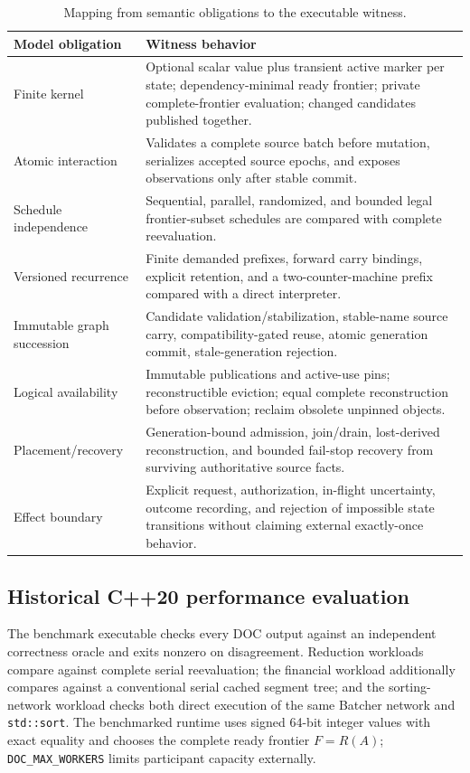 \begin{table}[t]
\centering\scriptsize
\caption{Mapping from semantic obligations to the executable witness.}\label{tab:witness}
\begin{tabularx}{\textwidth}{@{}p{}X@{}}
\toprule Model obligation & Witness behavior\\ \midrule
Finite kernel & Optional scalar value plus transient active marker per state; dependency-minimal ready frontier; private complete-frontier evaluation; changed candidates published together.\\
Atomic interaction & Validates a complete source batch before mutation, serializes accepted source epochs, and exposes observations only after stable commit.\\
Schedule independence & Sequential, parallel, randomized, and bounded legal frontier-subset schedules are compared with complete reevaluation.\\
Versioned recurrence & Finite demanded prefixes, forward carry bindings, explicit retention, and a two-counter-machine prefix compared with a direct interpreter.\\
Immutable graph succession & Candidate validation/stabilization, stable-name source carry, compatibility-gated reuse, atomic generation commit, stale-generation rejection.\\
Logical availability & Immutable publications and active-use pins; reconstructible eviction; equal complete reconstruction before observation; reclaim obsolete unpinned objects.\\
Placement/recovery & Generation-bound admission, join/drain, lost-derived reconstruction, and bounded fail-stop recovery from surviving authoritative source facts.\\
Effect boundary & Explicit request, authorization, in-flight uncertainty, outcome recording, and rejection of impossible state transitions without claiming external exactly-once behavior.\\ \bottomrule
\end{tabularx}
\end{table}

\subsection{Historical C++20 performance evaluation}
The benchmark executable checks every DOC output against an independent correctness oracle and exits nonzero on disagreement. Reduction workloads compare against complete serial reevaluation; the financial workload additionally compares against a conventional serial cached segment tree; and the sorting-network workload checks both direct execution of the same Batcher network and \texttt{std::sort}. The benchmarked runtime uses signed 64-bit integer values with exact equality and chooses the complete ready frontier $F=R(A)$; \texttt{DOC\_MAX\_WORKERS} limits participant capacity externally.

